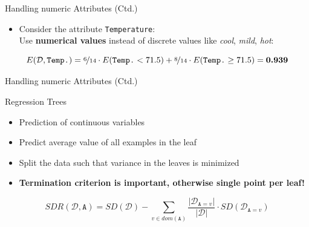 \begin{frame}{Handling numeric Attributes (Ctd.)}{}
	\begin{itemize}
		\item Consider the attribute \texttt{Temperature}: \\
			Use \textbf{numerical values} instead of discrete values like \textit{cool}, \textit{mild}, \textit{hot}:
	\end{itemize}
	\vspace*{-3mm}
	
	\vspace*{2mm}
	\begin{equation*}
			E(\mathcal{D}, \texttt{Temp.})
				= \nicefrac{6}{14} \cdot E(\texttt{Temp.} < 71.5) + \nicefrac{8}{14} \cdot E(\texttt{Temp.} \ge 71.5)
				= \bm{0.939}
		\end{equation*}
\end{frame}


\begin{frame}{Handling numeric Attributes (Ctd.)}{}
	
\end{frame}


\begin{frame}{Regression Trees}{}
	\begin{itemize}
		\item Prediction of continuous variables
		\item Predict average value of all examples in the leaf
		\item Split the data such that variance in the leaves is minimized
		\item \textbf{Termination criterion is important, otherwise single point per leaf!}
	\end{itemize}
	\begin{boxBlueNoFrame}
		\begin{equation}
			SDR(\mathcal{D}, \texttt{A}) = SD(\mathcal{D})
				- \sum_{v \in dom(\texttt{A})} \frac{\vert \mathcal{D}_{\texttt{A}=v} \vert}{\vert \mathcal{D} \vert}
				\cdot SD(\mathcal{D}_{\texttt{A}=v})
		\end{equation}
	\end{boxBlueNoFrame}
\end{frame}


